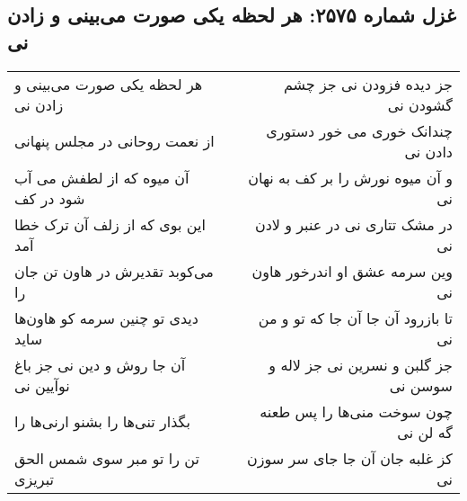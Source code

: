 \begin{center}
\section*{غزل شماره ۲۵۷۵: هر لحظه یکی صورت می‌بینی و زادن نی}
\label{sec:2575}
\begin{longtable}{l p{0.5cm} r}
هر لحظه یکی صورت می‌بینی و زادن نی
&&
جز دیده فزودن نی جز چشم گشودن نی
\\
از نعمت روحانی در مجلس پنهانی
&&
چندانک خوری می خور دستوری دادن نی
\\
آن میوه که از لطفش می آب شود در کف
&&
و آن میوه نورش را بر کف به نهان نی
\\
این بوی که از زلف آن ترک خطا آمد
&&
در مشک تتاری نی در عنبر و لادن نی
\\
می‌کوبد تقدیرش در هاون تن جان را
&&
وین سرمه عشق او اندرخور هاون نی
\\
دیدی تو چنین سرمه کو هاون‌ها ساید
&&
تا بازرود آن جا آن جا که تو و من نی
\\
آن جا روش و دین نی جز باغ نوآیین نی
&&
جز گلبن و نسرین نی جز لاله و سوسن نی
\\
بگذار تنی‌ها را بشنو ارنی‌ها را
&&
چون سوخت منی‌ها را پس طعنه گه لن نی
\\
تن را تو مبر سوی شمس الحق تبریزی
&&
کز غلبه جان آن جا جای سر سوزن نی
\\
\end{longtable}
\end{center}
